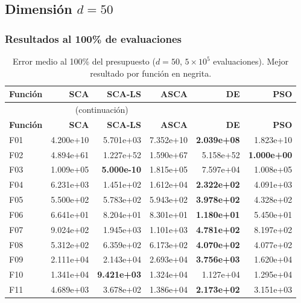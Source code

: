 \documentclass[12pt,a4paper]{article}
\begin{document}
\subsection{Dimensión $d = 50$}
 
\subsubsection{Resultados al 100\% de evaluaciones}
 
 
\begin{longtable}{lrrrrr}
\caption{Error medio al 100\% del presupuesto ($d=50$, $5\times10^5$ evaluaciones). Mejor resultado por función en negrita.}
\label{tab:resultados_sca_ls_d50}\\
\toprule
\textbf{Función} & \textbf{SCA} & \textbf{SCA-LS} & \textbf{ASCA} & \textbf{DE} & \textbf{PSO} \\
\midrule
\endfirsthead
\multicolumn{4}{c}{\tablename~\thetable{} (continuación)}\\
\toprule
\textbf{Función} & \textbf{SCA} & \textbf{SCA-LS} & \textbf{ASCA} & \textbf{DE} & \textbf{PSO} \\
\midrule
\endhead
\midrule
\endfoot
\bottomrule
\endlastfoot
F01  & 4.200e+10 & 5.701e+03 & 7.352e+10 & \textbf{2.039e+08} & 1.823e+10 \\
F02  & 4.894e+61 & 1.227e+52 & 1.590e+67 & 5.158e+52 & \textbf{1.000e+00} \\
F03  & 1.009e+05 & \textbf{5.000e-10} & 1.815e+05 & 7.597e+04 & 1.008e+05 \\
F04  & 6.231e+03 & 1.451e+02 & 1.612e+04 & \textbf{2.322e+02} & 4.091e+03 \\
F05  & 5.500e+02 & 5.783e+02 & 5.943e+02 & \textbf{3.978e+02} & 4.328e+02 \\
F06  & 6.641e+01 & 8.204e+01 & 8.301e+01 & \textbf{1.180e+01} & 5.450e+01 \\
F07  & 9.024e+02 & 1.945e+03 & 1.101e+03 & \textbf{4.781e+02} & 8.197e+02 \\
F08  & 5.312e+02 & 6.359e+02 & 6.173e+02 & \textbf{4.070e+02} & 4.077e+02 \\
F09  & 2.111e+04 & 2.143e+04 & 2.693e+04 & \textbf{3.756e+03} & 1.620e+04 \\
F10  & 1.341e+04 & \textbf{9.421e+03} & 1.324e+04 & 1.127e+04 & 1.295e+04 \\
F11  & 4.689e+03 & 3.678e+02 & 1.386e+04 & \textbf{2.173e+02} & 3.151e+03 \\

\end{longtable}
\end{document}
